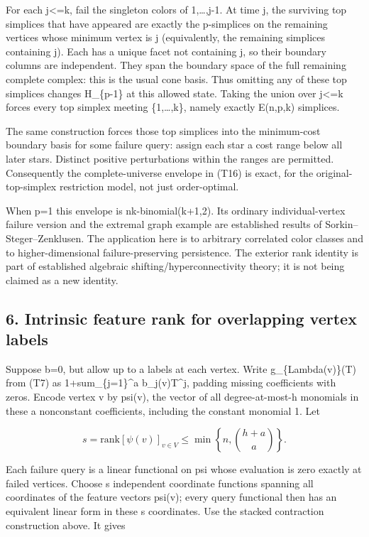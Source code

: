 For each j\textless=k, fail the singleton colors of 1,\ldots,j-1. At time j, the surviving top simplices that have appeared are exactly the p-simplices on the remaining vertices whose minimum vertex is j (equivalently, the remaining simplices containing j). Each has a unique facet not containing j, so their boundary columns are independent. They span the boundary space of the full remaining complete complex: this is the usual cone basis. Thus omitting any of these top simplices changes H\_\{p-1\} at this allowed state. Taking the union over j\textless=k forces every top simplex meeting \{1,\ldots,k\}, namely exactly E(n,p,k) simplices.

The same construction forces those top simplices into the minimum-cost boundary basis for some failure query: assign each star a cost range below all later stars. Distinct positive perturbations within the ranges are permitted. Consequently the complete-universe envelope in (T16) is exact, for the original-top-simplex restriction model, not just order-optimal.

When p=1 this envelope is nk-binomial(k+1,2). Its ordinary individual-vertex failure version and the extremal graph example are established results of Sorkin--Steger--Zenklusen. The application here is to arbitrary correlated color classes and to higher-dimensional failure-preserving persistence. The exterior rank identity is part of established algebraic shifting/hyperconnectivity theory; it is not being claimed as a new identity.

\hypertarget{af-3f6acd6e5b-intrinsic-feature-rank-for-overlapping-vertex-labels}{%
\subsection{6. Intrinsic feature rank for overlapping vertex labels}\label{af-3f6acd6e5b-intrinsic-feature-rank-for-overlapping-vertex-labels}}

Suppose b=0, but allow up to a labels at each vertex. Write g\_\{Lambda(v)\}(T) from (T7) as 1+sum\_\{j=1\}\^{}a b\_j(v)T\^{}j, padding missing coefficients with zeros. Encode vertex v by psi(v), the vector of all degree-at-most-h monomials in these a nonconstant coefficients, including the constant monomial 1. Let

\[
s=\mathrm{rank}[\psi(v)]_{v\in V}
       \le \min\left\{n,\binom{h+a}{a}\right\}.
 \tag{T21}
\]

Each failure query is a linear functional on psi whose evaluation is zero exactly at failed vertices. Choose s independent coordinate functions spanning all coordinates of the feature vectors psi(v); every query functional then has an equivalent linear form in these s coordinates. Use the stacked contraction construction above. It gives

